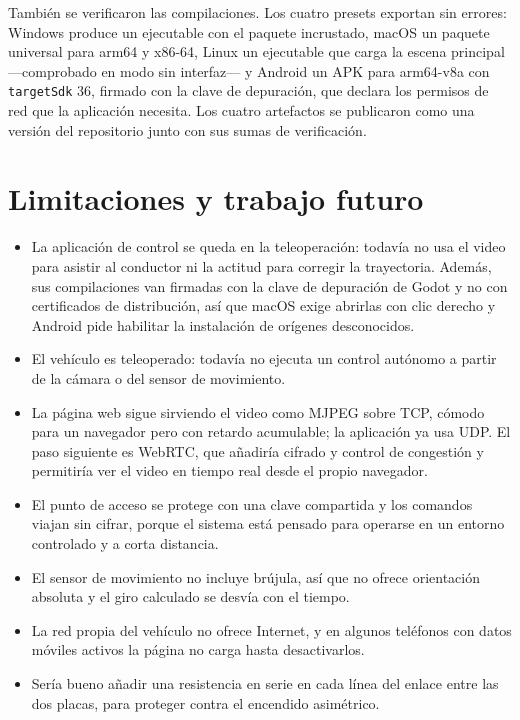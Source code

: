 \documentclass[journal]{IEEEtran}
\begin{document}
También se verificaron las compilaciones. Los cuatro presets exportan sin errores: Windows produce un ejecutable con el paquete incrustado, macOS un paquete universal para arm64 y x86-64, Linux un ejecutable que carga la escena principal ---comprobado en modo sin interfaz--- y Android un APK para arm64-v8a con \texttt{targetSdk} 36, firmado con la clave de depuración, que declara los permisos de red que la aplicación necesita. Los cuatro artefactos se publicaron como una versión del repositorio junto con sus sumas de verificación.

\section{Limitaciones y trabajo futuro}
\begin{itemize}
\item La aplicación de control se queda en la teleoperación: todavía no usa el video para asistir al conductor ni la actitud para corregir la trayectoria. Además, sus compilaciones van firmadas con la clave de depuración de Godot y no con certificados de distribución, así que macOS exige abrirlas con clic derecho y Android pide habilitar la instalación de orígenes desconocidos.
\item El vehículo es teleoperado: todavía no ejecuta un control autónomo a partir de la cámara o del sensor de movimiento.
\item La página web sigue sirviendo el video como MJPEG sobre TCP, cómodo para un navegador pero con retardo acumulable; la aplicación ya usa UDP. El paso siguiente es WebRTC, que añadiría cifrado y control de congestión y permitiría ver el video en tiempo real desde el propio navegador.
\item El punto de acceso se protege con una clave compartida y los comandos viajan sin cifrar, porque el sistema está pensado para operarse en un entorno controlado y a corta distancia.
\item El sensor de movimiento no incluye brújula, así que no ofrece orientación absoluta y el giro calculado se desvía con el tiempo.
\item La red propia del vehículo no ofrece Internet, y en algunos teléfonos con datos móviles activos la página no carga hasta desactivarlos.
\item Sería bueno añadir una resistencia en serie en cada línea del enlace entre las dos placas, para proteger contra el encendido asimétrico.
\end{itemize}
\end{document}
